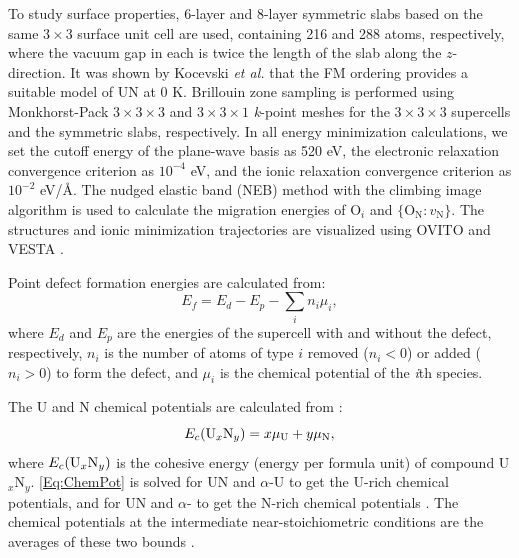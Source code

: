 \documentclass[preprint,12pt,sort&compress]{elsarticle}
\newcommand{\?}{\stackrel{?}{=}}
\providecommand{\DIFaddbegin}{\protect\color{blue}} %
\providecommand{\DIFaddend}{\protect\color{black}} %
\begin{document}
\DIFaddbegin 

\DIFaddend To study surface properties, 6-layer and 8-layer symmetric slabs based on the same $3 \times 3$ surface unit cell are used, containing 216 and 288 atoms, respectively, where the vacuum gap in each is twice the length of the slab along the $z$-direction. It was shown by Kocevski \textit{et al.}
\cite{Kocevski2022I} that the FM ordering provides a suitable model of UN at 0 K. Brillouin zone sampling is performed using Monkhorst-Pack \cite{Monkhorst1976} $3 \times 3 \times 3$ and $3 \times 3 \times 1$ \textit{k}-point meshes for the $3 \times 3 \times 3$ supercells and the symmetric slabs, respectively. In all energy minimization calculations, we set the cutoff energy of the plane-wave basis as 520 eV, the electronic relaxation convergence criterion as $10^{-4}$ eV, and the ionic relaxation convergence criterion as $10^{-2}$ eV/\AA. The nudged elastic band (NEB) method \cite{Henkelman2000a} with the climbing image algorithm \cite{Henkelman2000b} is used to calculate the migration energies of O$_i$ and $\{\text{O}_\text{N} \! : \! v_\text{N}\}$. The structures and ionic minimization trajectories are visualized using OVITO \cite{Stukowski2010} and VESTA \cite{Momma2008}.


Point defect formation energies are calculated from:
\begin{equation}
E_f = E_d - E_p - \sum_i n_i \mu_i,
\end{equation}
where $E_d$ and $E_p$ are the energies of the supercell with and without the defect, respectively, $n_i$ is the number of atoms of type $i$ removed ($n_i < 0$) or added ($n_i > 0$) to form the defect, and $\mu_i$ is the chemical potential of the \textit{i}th species.

The U and N chemical potentials are calculated from \cite{AbdulHameed2024}:
\begin{equation}
E_c(\text{U}_{x}\text{N}_{y}) = x \mu_{\ce{U}} + y \mu_{\ce{N}},
\label{Eq:ChemPot}
\end{equation}
where $E_c(\ce{U$_{x}$N$_{y}$})$ is the cohesive energy (energy per formula unit) of compound U$_x$N$_y$. \cref{Eq:ChemPot} is solved for UN and $\alpha$-U to get the U-rich chemical potentials, and for UN and $\alpha$- to get the N-rich chemical potentials \cite{Huang2020, Yang2021}. The chemical potentials at the intermediate near-stoichiometric conditions are the averages of these two bounds \cite{Woodward1998}.
\end{document}
